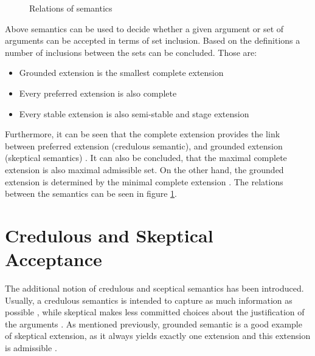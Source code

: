 \begin{figure}[h]
\centering
{}
\caption{Relations of semantics}
\label{fig:semanticsRelations}
\end{figure}

Above semantics can be used to decide whether a given argument or set of arguments can be accepted in terms of set inclusion.  Based on the definitions a number of inclusions between the sets can be concluded. Those are:
\begin{itemize}
	\item{Grounded extension is the smallest complete extension}
	\item{Every preferred extension is also complete}
	\item{Every stable extension is also semi-stable and stage extension}
\end{itemize}
Furthermore, it can be seen that the complete extension provides the link between preferred extension (credulous semantic), and grounded extension (skeptical semantics) \citep{dung1995}. It can also be concluded, that the maximal complete extension is also maximal admissible set. On the other hand, the grounded extension is determined by the minimal complete extension \citep{gaggl2009solving}. The relations between the semantics can be seen in figure \ref{fig:semanticsRelations}.

\section{Credulous and Skeptical Acceptance}
The additional notion of credulous and sceptical semantics has been introduced. Usually, a credulous semantics is intended to capture as much information as possible \citep{dix1995non}, while skeptical makes less committed choices about the justification of the arguments \citep{baroni2007comparing}. As mentioned previously, grounded semantic is a good example of skeptical extension, as it always yields exactly one extension and this extension is admissible \citep{caminada2007comparing}.

